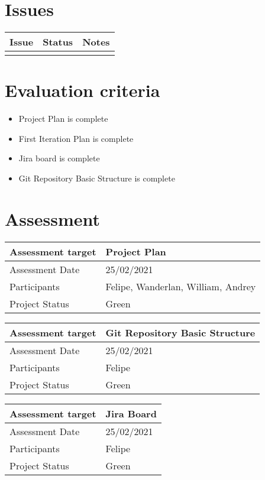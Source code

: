 \documentclass[a4paper,notitlepage]{article}%
\begin{document}
\section{Issues}

\noindent\begin{tabular}{|l|l|l|}
\hline
Issue & Status & Notes \\
\hline
 &  & \\
\hline
\end{tabular}

\section{Evaluation criteria}

\begin{itemize}
	\item Project Plan is complete
	\item	First Iteration Plan is complete
	\item Jira board is complete
	\item Git Repository Basic Structure is complete
\end{itemize}

\section{Assessment}

\noindent\begin{tabular}{|l|l|}
\hline
Assessment target & Project Plan\\\hline
Assessment Date & 25/02/2021\\\hline
Participants & Felipe, Wanderlan, William, Andrey \\\hline
Project Status & Green\\\hline
\end{tabular}

\noindent\begin{tabular}{|l|l|}
\hline
Assessment target & Git Repository Basic Structure\\\hline
Assessment Date & 25/02/2021\\\hline
Participants & Felipe \\\hline
Project Status & Green\\\hline
\end{tabular}

\noindent\begin{tabular}{|l|l|}
\hline
Assessment target & Jira Board\\\hline
Assessment Date & 25/02/2021\\\hline
Participants & Felipe \\\hline
Project Status & Green\\\hline
\end{tabular}
\end{document}
